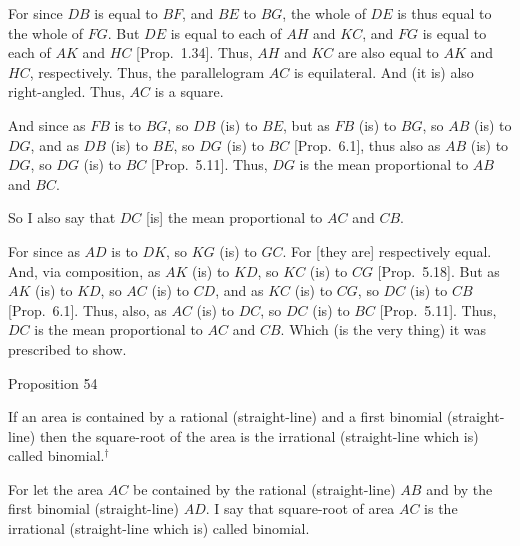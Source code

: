 \epsfysize=1.7in
\centerline{}

For since $DB$ is equal to $BF$, and $BE$ to $BG$, the whole of $DE$
is thus equal to the whole of $FG$. But $DE$ is equal to each of $AH$
and $KC$, and $FG$ is equal to each of $AK$ and $HC$ [Prop.~1.34]. Thus, $AH$ and $KC$ are also 
equal to  $AK$ and $HC$, respectively. Thus, the parallelogram $AC$
is equilateral. And (it is) also right-angled. Thus, $AC$ is a square.

And since as $FB$ is to $BG$, so $DB$ (is) to $BE$, but as $FB$
(is) to $BG$, so $AB$ (is) to $DG$, and as $DB$ (is) to $BE$, so
$DG$ (is) to $BC$ [Prop.~6.1], thus also as $AB$ (is) to $DG$, so $DG$  (is) to $BC$ [Prop.~5.11]. Thus, $DG$ is the mean proportional
to $AB$ and $BC$.

So I also say that $DC$ [is] the mean proportional to $AC$ and $CB$.

For since as $AD$ is to $DK$, so $KG$ (is) to $GC$. For [they are]  respectively equal. And, via composition, as $AK$ (is) to $KD$, so
$KC$ (is) to $CG$ [Prop.~5.18]. But as
$AK$ (is) to $KD$, so $AC$ (is) to $CD$, and as $KC$ (is) to $CG$,
so $DC$ (is) to $CB$ [Prop.~6.1]. Thus, also, as $AC$ (is) to $DC$, so
$DC$ (is) to $BC$ [Prop.~5.11]. Thus, $DC$ is the mean proportional to $AC$ and
$CB$. Which (is the very thing) it was prescribed to show.


\begin{center}
{\large Proposition 54}
\end{center}

If an area is contained by a rational (straight-line)
and a first binomial (straight-line) then  the  square-root  of the area is
the irrational (straight-line which is) called binomial.$^\dag$

\epsfysize=1.3in
\centerline{}

For let the area $AC$ be contained by the rational (straight-line) $AB$
and by the first binomial (straight-line) $AD$. I say that square-root of 
area $AC$ is the irrational (straight-line which is) called binomial.


